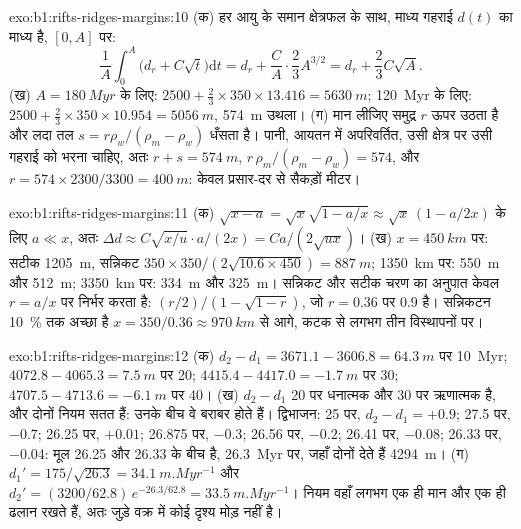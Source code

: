 \begin{solution}{exo:b1:rifts-ridges-margins:10}
(क) हर आयु के समान क्षेत्रफल के साथ, माध्य गहराई $d(t)$ का माध्य है, $[0, A]$ पर:
\[
  \frac1A\int_0^A\bigl(d_r + C\sqrt t\bigr)\mathrm dt = d_r + \frac CA\cdot\frac23A^{3/2}
  = d_r + \frac23C\sqrt A.
\]
(ख) $A = \qty{180}{Myr}$ के लिए: $2500 + \frac23\times350\times13.416 =
\qty{5630}{m}$; \qty{120}{Myr} के लिए: $2500 + \frac23\times350\times10.954 =
\qty{5056}{m}$, \qty{574}{m} उथला। (ग) मान लीजिए समुद्र $r$ ऊपर उठता है और लदा तल $s = r\rho_w/(\rho_m - \rho_w)$ धँसता है। पानी, आयतन में अपरिवर्तित, उसी क्षेत्र पर उसी गहराई को भरना चाहिए, अतः $r + s = \qty{574}{m}$,
$r\,\rho_m/(\rho_m - \rho_w) = 574$, और $r = 574\times2300/3300 =
\qty{400}{m}$: केवल प्रसार-दर से सैकड़ों मीटर।
\end{solution}

\begin{solution}{exo:b1:rifts-ridges-margins:11}
(क) $\sqrt{x - a} = \sqrt x\sqrt{1 - a/x} \approx \sqrt x\,(1 - a/2x)$ के लिए
$a \ll x$, अतः
$\Delta d \approx C\sqrt{x/u}\cdot a/(2x) = Ca/(2\sqrt{ux})$।
(ख) $x = \qty{450}{km}$ पर: सटीक \qty{1205}{m}, सन्निकट
$350\times350/(2\sqrt{10.6\times450}) = \qty{887}{m}$; \qty{1350}{km} पर:
\qty{550}{m} और \qty{512}{m}; \qty{3350}{km} पर: \qty{334}{m} और
\qty{325}{m}। सन्निकट और सटीक चरण का अनुपात केवल $r = a/x$ पर निर्भर करता है: $(r/2)/(1 - \sqrt{1 - r})$, जो $r = 0.36$ पर 0.9 है। सन्निकटन \qty{10}{\percent} तक अच्छा है $x = 350/0.36 \approx
\qty{970}{km}$ से आगे, कटक से लगभग तीन विस्थापनों पर।
\end{solution}

\begin{solution}{exo:b1:rifts-ridges-margins:12}
(क) $d_2 - d_1 = 3671.1 - 3606.8 = \qty{64.3}{m}$ पर \qty{10}{Myr};
$4072.8 - 4065.3 = \qty{7.5}{m}$ पर 20; $4415.4 - 4417.0 = \qty{-1.7}{m}$ पर
30; $4707.5 - 4713.6 = \qty{-6.1}{m}$ पर 40। (ख) $d_2 - d_1$ 20 पर धनात्मक और 30 पर ऋणात्मक है, और दोनों नियम सतत हैं: उनके बीच वे बराबर होते हैं। द्विभाजन: 25 पर, $d_2 - d_1 = +0.9$; 27.5 पर, $-0.7$; 26.25 पर, $+0.01$; 26.875 पर, $-0.3$; 26.56 पर, $-0.2$; 26.41 पर, $-0.08$; 26.33 पर, $-0.04$: मूल 26.25 और 26.33 के बीच है, \qty{26.3}{Myr} पर, जहाँ दोनों देते हैं \qty{4294}{m}। (ग) $d_1' = 175/\sqrt{26.3} = \qty{34.1}{m.Myr^{-1}}$ और $d_2' = (3200/62.8)\,e^{-26.3/62.8} = \qty{33.5}{m.Myr^{-1}}$। नियम वहाँ लगभग एक ही मान और एक ही ढलान रखते हैं, अतः जुड़े वक्र में कोई दृश्य मोड़ नहीं है।
\end{solution}

